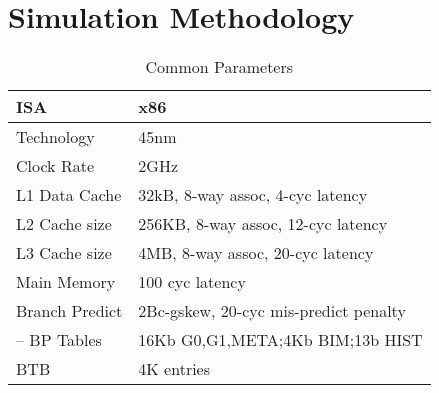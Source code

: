 \section{Simulation Methodology}
\label{sec:simulation}

\begin{table}[!htbp]
\centering
\begin{tabular}{ l|l }
\hline
ISA					&x86\\ \hline
Technology          &45nm \\ \hline
Clock Rate          &2GHz\\ \hline
L1 Data Cache       &32kB, 8-way assoc, 4-cyc latency\\ \hline
L2 Cache size       &256KB, 8-way assoc, 12-cyc latency\\ \hline
L3 Cache size       &4MB, 8-way assoc, 20-cyc latency\\ \hline
Main Memory         &100 cyc latency\\ \hline
Branch Predict	    &2Bc-gskew, 20-cyc mis-predict penalty\\ \hline
-- BP Tables        &16Kb G0,G1,META;4Kb BIM;13b HIST\\ \hline
BTB                 &4K entries \\ \hline
\end{tabular}
\caption{Common Parameters}
\label{tab:params}
\end{table}

